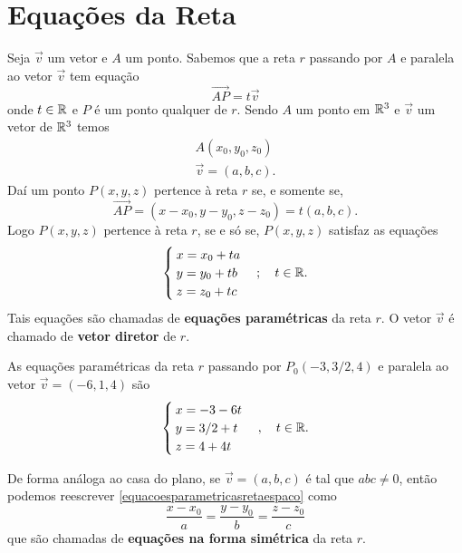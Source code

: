 \section{Equações da Reta}

Seja $\vec{v}$ um vetor e $A$ um ponto. Sabemos que a reta $r$ passando por $A$ e paralela ao vetor $\vec{v}$ tem equação
\begin{equation}
    \vec{AP} = t\vec{v}
\end{equation}
onde $t \in \mathbb{R}$ e $P$ é um ponto qualquer de $r$. Sendo $A$ um ponto em $\mathbb{R}^3$ e $\vec{v}$ um vetor de $\mathbb{R}^3$ temos
\begin{align*}
    A(x_0, y_0, z_0) \\
    \vec{v} = (a, b, c).
\end{align*}
Daí um ponto $P(x, y, z)$ pertence à reta $r$ se, e somente se,
\[
    \vec{AP} = (x - x_0, y - y_0, z - z_0) = t(a, b, c).
\]
Logo $P(x, y, z)$ pertence à reta $r$, se e só se, $P(x,y,z)$ satisfaz as equações
\begin{equation}\label{equacoesparametricasretaespaco}
    \begin{cases}
        x = x_0 + ta \\
        y = y_0 + tb \\
        z = z_0 + tc
    \end{cases}; \quad t \in \mathbb{R}.
\end{equation}
Tais equações são chamadas de \textbf{equações paramétricas} da reta $r$. O vetor $\vec{v}$ é chamado de \textbf{vetor diretor} de $r$.

\begin{exemplo}
    As equações paramétricas da reta $r$ passando por $P_0(-3,3/2,4)$ e paralela ao vetor $\vec{v} = (-6,1,4)$ são
    \[
        \begin{cases}
            x = -3 - 6t \\
            y = 3/2 + t \\
            z = 4 + 4t
        \end{cases},\quad t \in \mathbb{R}.
    \]
\end{exemplo}

De forma análoga ao casa do plano, se $\vec{v} = (a,b,c)$ é tal que $abc \ne 0$, então podemos reescrever \eqref{equacoesparametricasretaespaco} como
\[
    \dfrac{x - x_0}{a} = \dfrac{y - y_0}{b} = \dfrac{z - z_0}{c}
\]
que são chamadas de \textbf{equações na forma simétrica} da reta $r$.

